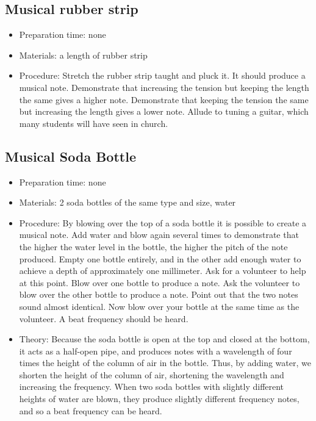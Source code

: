 \subsection{Musical rubber strip}
\begin{itemize}
\item{Preparation time: none}
\item{Materials: a length of rubber strip}
\item{Procedure: Stretch the rubber strip taught and pluck it. It should produce a musical note. Demonstrate that increasing the tension but keeping the length the same gives a higher note. Demonstrate that keeping the tension the same but increasing the length gives a lower note. Allude to tuning a guitar, which many students will have seen in church.}
\end{itemize}

\subsection{Musical Soda Bottle}
\begin{itemize}
\item{Preparation time: none}
\item{Materials: 2 soda bottles of the same type and size, water}
\item{Procedure: By blowing over the top of a soda bottle it is possible to create a musical note. Add water and blow again several times to demonstrate that the higher the water level in the bottle, the higher the pitch of the note produced. Empty one bottle entirely, and in the other add enough water to achieve a depth of approximately one millimeter. Ask for a volunteer to help at this point. Blow over one bottle to produce a note. Ask the volunteer to blow over the other bottle to produce a note. Point out that the two notes sound almost identical. Now blow over your bottle at the same time as the volunteer. A beat frequency should be heard.}
\item{Theory: Because the soda bottle is open at the top and closed at the bottom, it acts as a half-open pipe, and produces notes with a wavelength of four times the height of the column of air in the bottle. Thus, by adding water, we shorten the height of the column of air, shortening the wavelength and increasing the frequency. When two soda bottles with slightly different heights of water are blown, they produce slightly different frequency notes, and so a beat frequency can be heard.}
\end{itemize}

